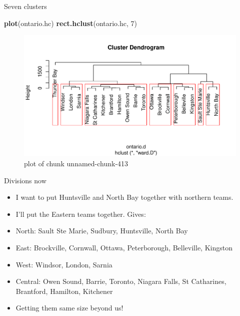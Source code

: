 \documentclass[ignorenonframetext,]{beamer}
\newenvironment{Shaded}{\begin{snugshade}}{\end{snugshade}}
\newcommand{\DecValTok}[1]{\textcolor[rgb]{0.00,0.00,0.81}{#1}}
\newcommand{\KeywordTok}[1]{\textcolor[rgb]{0.13,0.29,0.53}{\textbf{#1}}}
\newcommand{\NormalTok}[1]{#1}
\begin{document}
\begin{frame}[fragile]{Seven clusters}
\protect\hypertarget{seven-clusters}{}

\begin{Shaded}
\begin{Highlighting}[]
\KeywordTok{plot}\NormalTok{(ontario.hc)}
\KeywordTok{rect.hclust}\NormalTok{(ontario.hc, }\DecValTok{7}\NormalTok{)}
\end{Highlighting}
\end{Shaded}

\begin{figure}
\centering
\includegraphics{figure/unnamed-chunk-413-1.pdf}
\caption{plot of chunk unnamed-chunk-413}
\end{figure}

\end{frame}

\begin{frame}{Divisions now}
\protect\hypertarget{divisions-now}{}

\begin{itemize}
\item
  I want to put Huntsville and North Bay together with northern teams.
\item
  I'll put the Eastern teams together. Gives:
\item
  North: Sault Ste Marie, Sudbury, Huntsville, North Bay
\item
  East: Brockville, Cornwall, Ottawa, Peterborough, Belleville, Kingston
\item
  West: Windsor, London, Sarnia
\item
  Central: Owen Sound, Barrie, Toronto, Niagara Falls, St Catharines,
  Brantford, Hamilton, Kitchener
\item
  Getting them same size beyond us!
\end{itemize}

\end{frame}
\end{document}
